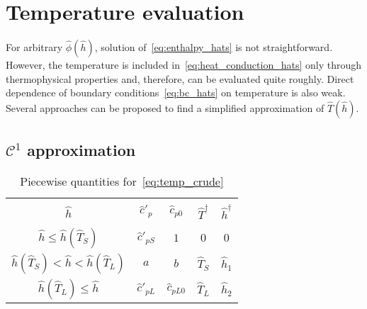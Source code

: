 \documentclass{article}
\begin{document}
\section{Temperature evaluation}

For arbitrary \(\hat{\phi}(\hat{h})\), solution of~\eqref{eq:enthalpy_hats} is not straightforward.
However, the temperature is included in~\eqref{eq:heat_conduction_hats} only through thermophysical properties
and, therefore, can be evaluated quite roughly.
Direct dependence of boundary conditions~\eqref{eq:bc_hats} on temperature is also weak.
Several approaches can be proposed to find a simplified approximation of \(\hat{T}(\hat{h})\).

\subsection{\(\mathcal{C}^1\) approximation}

\begin{table}[ht]
    \centering
    \caption{Piecewise quantities for~\eqref{eq:temp_crude}}
    \label{table:temp_params}
    \begin{tabular}{c|cccc}
        \hline\\[-1em]
        \(\hat{h}\)                         & \(\hat{c}'_p\)    & \(\hat{c}_{p0}\)  & \(\hat{T}^\dag\) & \(\hat{h}^\dag\) \\[0.3em]
        \hline\\[-1em]
        \(\hat{h} \leq \hat{h}(\hat{T}_S)\)          & \(\hat{c}'_{pS}\) & \(1\)             & \(0\)            & \(0\)            \\[0.3em]
        \(\hat{h}(\hat{T}_S) < \hat{h} < \hat{h}(\hat{T}_L)\) & \(a\)             & \(b\)             & \(\hat{T}_S\)    & \(\hat{h}_1\)    \\[0.3em]
        \(\hat{h}(\hat{T}_L) \leq \hat{h}\)          & \(\hat{c}'_{pL}\) & \(\hat{c}_{pL0}\) & \(\hat{T}_L\)    & \(\hat{h}_2\)    \\[0.3em]
        \hline
    \end{tabular}
\end{table}
\end{document}
